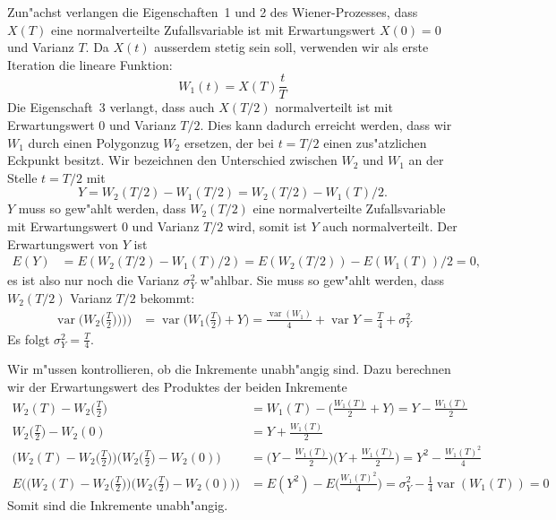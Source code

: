 Zun"achst verlangen die Eigenschaften~1 und 2 des Wiener-Prozesses,
dass $X(T)$ eine normalverteilte Zufallsvariable ist mit Erwartungswert
$X(0)=0$ und Varianz $T$.
Da $X(t)$ ausserdem stetig sein soll, verwenden wir als erste Iteration
die lineare Funktion:
\[
W_1(t) = X(T)\frac{t}{T}
\]
Die Eigenschaft~3 verlangt, dass auch $X(T/2)$ normalverteilt ist mit
Erwartungswert $0$ und Varianz $T/2$.
Dies kann dadurch erreicht werden, dass wir $W_1$ durch einen 
Polygonzug $W_2$ ersetzen, der bei $t=T/2$ einen zus"atzlichen
Eckpunkt besitzt.
Wir bezeichnen den Unterschied zwischen $W_2$ und $W_1$ an der
Stelle $t=T/2$ mit
\[
Y=W_2(T/2)-W_1(T/2)=W_2(T/2) - W_1(T)/2.
\]
$Y$ muss so gew"ahlt werden, dass $W_2(T/2)$ eine normalverteilte
Zufallsvariable mit Erwartungswert $0$ und Varianz $T/2$ wird,
somit ist $Y$ auch normalverteilt.
Der Erwartungswert von $Y$ ist
\begin{align*}
E(Y)&=E(W_2(T/2) - W_1(T)/2)=E(W_2(T/2))-E(W_1(T))/2=0,
\end{align*}
es ist also nur noch die Varianz $\sigma^2_Y$ w"ahlbar.
Sie muss so gew"ahlt werden, dass $W_2(T/2)$ Varianz $T/2$
bekommt:
\begin{align*}
\operatorname{var}\biggl(W_2\biggl(\frac{T}2\biggr))\biggr))
&=
\operatorname{var}\biggl(W_1\biggl(\frac{T}2\biggr) + Y\biggr)
=
\frac{\operatorname{var}(W_1)}4 + \operatorname{var}Y
=
\frac{T}4 +\sigma_Y^2
\end{align*}
Es folgt $\sigma_Y^2=\frac{T}4$.

Wir m"ussen kontrollieren, ob die Inkremente unabh"angig sind.
Dazu berechnen wir der Erwartungswert des Produktes der
beiden Inkremente
\begin{align*}
W_2(T)-W_2\biggl(\frac{T}2\biggr)
&=
W_1(T)-\biggl(\frac{W_1(T)}2 + Y\biggr)
=
Y-\frac{W_1(T)}2
\\
W_2\biggl(\frac{T}2\biggr)-W_2(0)
&=
Y+
\frac{W_1(T)}2
\\
\biggl(W_2(T)-W_2\biggl(\frac{T}2\biggr)\biggr)
\biggl(W_2\biggl(\frac{T}2\biggr)-W_2(0)\biggr)
&=
\biggl(Y-\frac{W_1(T)}2\biggr)\biggl(Y+\frac{W_1(T)}2\biggr)
=
Y^2-\frac{W_1(T)^2}4
\\
E\biggl(
\biggl(W_2(T)-W_2\biggl(\frac{T}2\biggr)\biggr)
\biggl(W_2\biggl(\frac{T}2\biggr)-W_2(0)\biggr)
\biggr)
&=
E(Y^2)-E\biggl(\frac{W_1(T)^2}4\biggr)
=
\sigma_Y^2 - \frac14\operatorname{var}(W_1(T))
=
0
\end{align*}
Somit sind die Inkremente unabh"angig.

